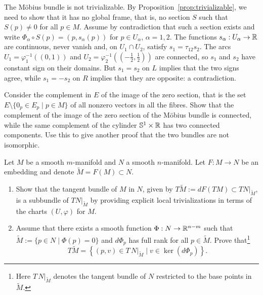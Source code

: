 \begin{example}
	The M\"obius bundle is not trivializable.
	By Proposition~\ref{prop:trivializable}, we need to show that it has no global frame, that is, no section $S$ such that $S(p)\neq0$ for all $p\in M$.
	Assume by contradiction that such a section exists and write $\varPhi_\alpha\circ S(p) = (p, s_\alpha(p))$ for $p\in U_\alpha$, $\alpha=1,2$.
	The functions $s_\alpha:U_\alpha\to\mathbb{R}$ are continuous, never vanish and, on $U_1\cap U_2$, satisfy $s_1 = \tau_{12}s_2$.
	The arcs $U_1=\varphi_1^{-1}((0,1))$ and $U_2=\varphi_2^{-1}((-\frac12,\frac12))$ are connected, so $s_1$ and $s_2$ have constant sign on their domains.
	But $s_1=s_2$ on $L$ implies that the two signs agree, while $s_1=-s_2$ on $R$ implies that they are opposite: a contradiction.
\end{example}

\begin{exercise}
  Consider the complement in $E$ of the image of the zero section, that is the set $E\setminus\{0_p\in E_p\mid p\in M\}$ of all nonzero vectors in all the fibres.
	Show that the complement of the image of the zero section of the M\"obius bundle is connected, while the same complement of the cylinder $\mathbb{S}^1\times\mathbb{R}$ has two connected components.
	Use this to give another proof that the two bundles are not isomorphic.
\end{exercise}

\begin{exercise}
	Let $M$ be a smooth $m$-manifold and $N$ a smooth $n$-manifold.
	Let $F:M\to N$ be an embedding and denote $\widetilde M = F(M)\subset N$.
	\begin{enumerate}
		\item Show that the tangent bundle of $M$ in $N$, given by $T\widetilde M := dF(TM) \subset TN\big|_{\widetilde M}$, is a subbundle of $TN\big|_{\widetilde M}$ by providing explicit local trivializations in terms of the charts $(U, \varphi)$ for $M$.
		\item Assume that there exists a smooth function $\Phi:N\to\mathbb{R}^{n-m}$ such that $\widetilde M := \{p\in N \mid \Phi(p) = 0\}$ and $d\Phi_p$ has full rank for all $p\in\widetilde M$. Prove that\footnote{Here $T\,N|_{\widetilde{M}}$ denotes the tangent bundle of $N$ restricted to the base points in $\widetilde{M}$.}
		      \begin{equation}
			      T\widetilde{M} = \left\{(p,v)\in T\,N|_{\widetilde{M}} \mid v\in\ker(d\Phi_p)\right\}.
		      \end{equation}
	\end{enumerate}
\end{exercise}
